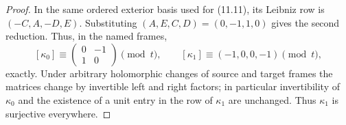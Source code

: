 \begin{proof}
In the same ordered exterior basis used for (11.11), its Leibniz row is
\((-C,A,-D,E)\).  Substituting
\((A,E,C,D)=(0,-1,1,0)\) gives the second reduction.  Thus, in the named
frames,
\[
 [\kappa_0]\equiv\begin{pmatrix}0&-1\\1&0\end{pmatrix}\pmod t,
 \qquad [\kappa_1]\equiv(-1,0,0,-1)\pmod t,
\]
exactly.  Under arbitrary holomorphic changes of source and target frames
the matrices change by invertible left and right factors; in particular
invertibility of \(\kappa_0\) and the existence of a unit entry in the row
of \(\kappa_1\) are unchanged.  Thus $\kappa_1$ is surjective everywhere.
\end{proof}
